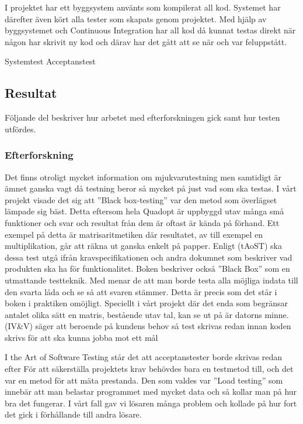 	I projektet har ett byggsystem använts som kompilerat all kod. Systemet har därefter även kört alla tester som skapats genom projektet.
	Med hjälp av byggsystemet och Continuous Integration har all kod då kunnat testas direkt när någon har skrivit ny kod och därav har det gått att se när och var feluppstått.
	
	Systemtest
	Acceptanstest
	
	
	
	\subsection{Resultat}	
	Följande del beskriver hur arbetet med efterforskningen gick samt hur testen utfördes. \newline
	\subsubsection{Efterforskning}
	Det finns otroligt mycket information om mjukvarutestning men samtidigt är ämnet ganska vagt då testning beror så mycket på just vad som ska testas. I vårt projekt visade det sig att ''Black box-testing'' var den metod som överlägset lämpade sig bäst. Detta eftersom hela Quadopt är uppbyggd utav många små funktioner och svar och resultat från dem är oftast är kända på förhand. Ett exempel på detta är matrisaritmetiken där resultatet, av till exempel en multiplikation, går att räkna ut ganska enkelt på papper. Enligt (tAoST) ska dessa test utgå ifrån kravspecifikationen och andra dokumnet som beskriver vad produkten ska ha för funktionalitet. Boken beskriver också ''Black Box'' som en utmattande testteknik. Med menar de att man borde testa alla möjliga indata till den svarta låda och se så att svaren stämmer. Detta är precis som det står i boken i praktiken omöjligt. Speciellt i vårt projekt där det enda som begränsar antalet olika sätt en matris, bestående utav tal, kan se ut på är datorns minne. (IV\&V) säger att beroende på kundens behov så test skrivas redan innan koden skrivs för att ska kunna jobba mot ett mål \newline
	
	I the Art of Software Testing står det att acceptanstester borde skrivas redan efter
	För att säkerställa projektets krav behövdes bara en testmetod till, och det var en metod för att mäta prestanda. Den som valdes var ''Load testing'' som innebär att man belastar programmet med mycket data och så kollar man på hur bra det fungerar. I vårt fall gav vi lösaren många problem och kollade på hur fort det gick i förhållande till andra lösare. \newline
	
